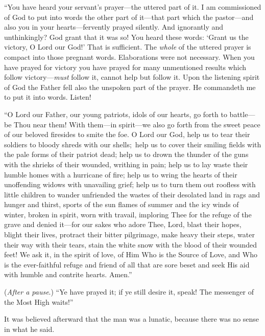 ``You have heard your servant's prayer---the uttered part of it. I am
commissioned of God to put into words the other part of it---that part
which the pas\-tor---and also you in your hearts---fervently prayed
silently. And ignorantly and unthinkingly? God grant that it was so!
You heard these words: `Grant us the victory, O Lord our God!' That is
sufficient. The \textit{whole} of the uttered prayer is compact into
those pregnant words. Elaborations were not necessary. When you have
prayed for victory you have prayed for many unmentioned results which
follow vic\-to\-ry---\textit{must} follow it, cannot help but follow
it. Upon the listening spirit of God the Father fell also the unspoken
part of the prayer. He commandeth me to put it into words. Listen!

``O Lord our Father, our young patriots, idols of  our
hearts, go forth to bat\-tle---be Thou near them! With them---in
spir\-it---we also go forth from the sweet peace of our beloved
firesides to smite the foe. O Lord our God, help us to tear their
soldiers to bloody shreds with our shells; help us to cover their
smiling fields with the pale forms of their patriot dead; help us to
drown the thunder of the guns with the shrieks of their wounded,
writhing in pain; help us to lay waste their humble homes with a
hurricane of fire; help us to wring the hearts of their unoffending
widows with unavailing grief; help us to turn them out roofless with
little children to wander unfriended the wastes of their desolated
land in rags and hunger and thirst, sports of the sun flames of summer
and the icy winds of winter, broken in spirit, worn with travail,
imploring Thee for the refuge of the grave and denied it---for our
sakes who adore Thee, Lord, blast their hopes, blight their lives,
protract their bitter pilgrimage, make heavy their steps, water their
way with their tears, stain the white snow with the blood of their
wounded feet! We ask it, in the spirit of love, of Him Who is the
Source of Love, and Who is the ever-faithful refuge and friend of all
that are sore beset and seek His aid with humble and contrite hearts.
Amen.''

(\textit{After a pause}.) ``Ye have prayed it; if ye still desire it,
speak! The messenger of the Most High waits!''

It was believed afterward that the man was a lunatic, because there
was no sense in what he said.

